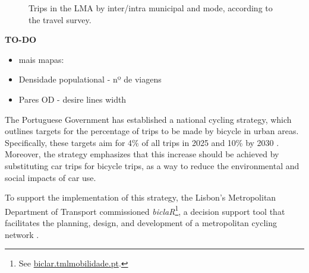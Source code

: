 \documentclass[review, doubleblind, 3p,
authoryear]{elsarticle} %
\providecommand{\tightlist}{%
  \setlength{\itemsep}{0pt}\setlength{\parskip}{0pt}}
\begin{document}
\begin{figure}
\caption{\label{mododist}Trips in the LMA by inter/intra municipal and mode, according to the travel survey.}\label{fig:mododist}
\end{figure}

\textbf{TO-DO}

\begin{itemize}
\tightlist
\item
  mais mapas:
\item
  Densidade populational - nº de viagens
\item
  Pares OD - desire lines width
\end{itemize}

The Portuguese Government has established a national cycling strategy,
which outlines targets for the percentage of trips to be made by bicycle
in urban areas. Specifically, these targets aim for 4\% of all trips in
2025 and 10\% by 2030 \citep{ENMAC}. Moreover, the strategy emphasizes
that this increase should be achieved by substituting car trips for
bicycle trips, as a way to reduce the environmental and social impacts
of car use.

To support the implementation of this strategy, the Lisbon's
Metropolitan Department of Transport commissioned
\emph{biclaR}\footnote{See
  \href{https://biclar.tmlmobilidade.pt/}{biclar.tmlmobilidade.pt}.}, a
decision support tool that facilitates the planning, design, and
development of a metropolitan cycling network \citep{felix2023}.
\end{document}
